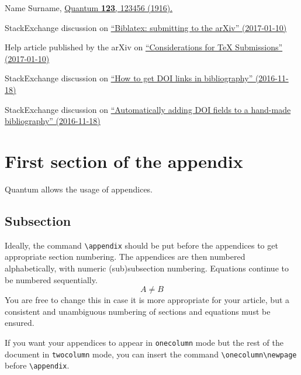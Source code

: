 \documentclass[a4paper,twocolumn,superscriptaddress,11pt,accepted=2017-05-09]{quantumarticle}
\begin{document}

\begin{thebibliography}{9}
  Name Surname,
  \href{https://doi.org/10.22331/
        idonotexist}{Quantum
        \textbf{123}, 123456 (1916).}

  StackExchange discussion on \href{http://tex.stackexchange.com/questions/26990/biblatex-submitting-to-the-arxiv}{``Biblatex: submitting to the arXiv'' (2017-01-10)}

  Help article published by the arXiv on \href{https://arxiv.org/help/submit_tex}{``Considerations for TeX Submissions'' (2017-01-10)}

  StackExchange discussion on \href{http://tex.stackexchange.com/questions/3802/how-to-get-doi-links-in-bibliography}{``How to get DOI links in bibliography'' (2016-11-18)}
  
  StackExchange discussion on \href{http://tex.stackexchange.com/questions/6810/automatically-adding-doi-fields-to-a-hand-made-bibliography}{``Automatically adding DOI fields to a hand-made bibliography'' (2016-11-18)}
\end{thebibliography}



\onecolumn\newpage
\appendix

\section{First section of the appendix}
Quantum allows the usage of appendices.

\subsection{Subsection}
Ideally, the command \texttt{\textbackslash{}appendix} should be put before the appendices to get appropriate section numbering.
The appendices are then numbered alphabetically, with numeric (sub)subsection numbering.
Equations continue to be numbered sequentially.
\begin{equation}
  A \neq B
\end{equation}
You are free to change this in case it is more appropriate for your article, but a consistent and unambiguous numbering of sections and equations must be ensured.

If you want your appendices to appear in \texttt{onecolumn} mode but the rest of the document in \texttt{twocolumn} mode, you can insert the command \texttt{\textbackslash{}onecolumn\textbackslash{}newpage} before \texttt{\textbackslash{}appendix}.   
\end{document}
